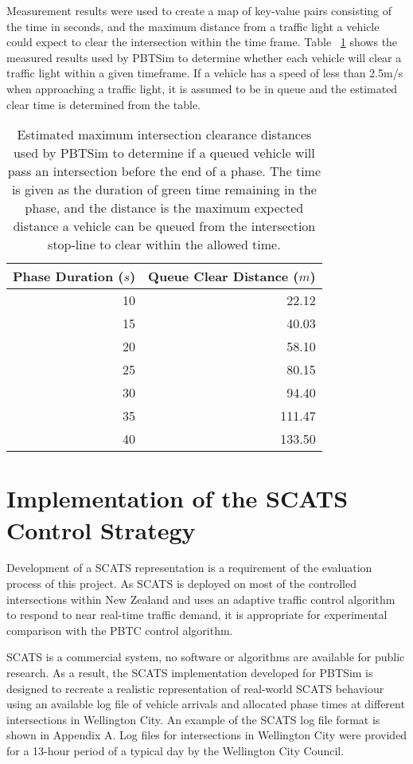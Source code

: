 Measurement results were used to create a map of key-value pairs consisting of the time in seconds, and the maximum distance from a traffic light a vehicle could expect to clear the intersection within the time frame. Table ~\ref{vehiclecleardistances} shows the measured results used by PBTSim to determine whether each vehicle will clear a traffic light within a given timeframe. If a vehicle has a speed of less than 2.5m/s when approaching a traffic light, it is assumed to be in queue and the estimated clear time is determined from the table.

\begin{table}[]
\begin{center}
\begin{tabular}{rr}
\toprule
Phase Duration ($s$) & Queue Clear Distance ($m$) \\
\midrule
10 & 22.12 \\
15 & 40.03 \\
20 & 58.10 \\
25 & 80.15 \\
30 & 94.40 \\
35 & 111.47 \\
40 & 133.50 \\
\bottomrule
\end{tabular}
\end{center}
\caption{ Estimated maximum intersection clearance distances used by PBTSim to determine if a queued vehicle will pass an intersection before the end of a phase. The time is given as the duration of green time remaining in the phase, and the distance is the maximum expected distance a vehicle can be queued from the intersection stop-line to clear within the allowed time. }
\label{vehiclecleardistances}
\end{table}

\section{Implementation of the SCATS Control Strategy}

Development of a SCATS representation is a requirement of the evaluation process of this project. As SCATS is deployed on most of the controlled intersections within New Zealand and uses an adaptive traffic control algorithm to respond to near real-time traffic demand, it is appropriate for experimental comparison with the PBTC control algorithm.

SCATS is a commercial system, no software or algorithms are available for public research. As a result, the SCATS implementation developed for PBTSim is designed to recreate a realistic representation of real-world SCATS behaviour using an available log file of vehicle arrivals and allocated phase times at different intersections in Wellington City. An example of the SCATS log file format is shown in Appendix A. Log files for intersections in Wellington City were provided for a 13-hour period of a typical day by the Wellington City Council.

